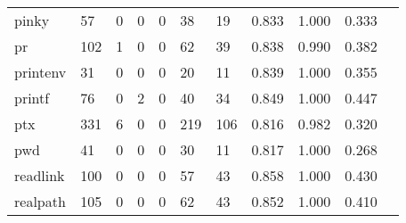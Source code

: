 \begin{longtable}{lp{1.10cm}p{1.10cm}p{1.10cm}p{1.10cm}p{1.10cm}p{1.10cm}p{1.10cm}p{1.10cm}p{1.10cm}p{1.10cm}}
pinky     &                     57 &                                  0 &                                 0 &                                0 &                                38 &                              19 &                          0.833 &                                 1.000 &                               0.333 \\
pr        &                    102 &                                  1 &                                 0 &                                0 &                                62 &                              39 &                          0.838 &                                 0.990 &                               0.382 \\
printenv  &                     31 &                                  0 &                                 0 &                                0 &                                20 &                              11 &                          0.839 &                                 1.000 &                               0.355 \\
printf    &                     76 &                                  0 &                                 2 &                                0 &                                40 &                              34 &                          0.849 &                                 1.000 &                               0.447 \\
ptx       &                    331 &                                  6 &                                 0 &                                0 &                               219 &                             106 &                          0.816 &                                 0.982 &                               0.320 \\
pwd       &                     41 &                                  0 &                                 0 &                                0 &                                30 &                              11 &                          0.817 &                                 1.000 &                               0.268 \\
readlink  &                    100 &                                  0 &                                 0 &                                0 &                                57 &                              43 &                          0.858 &                                 1.000 &                               0.430 \\
realpath  &                    105 &                                  0 &                                 0 &                                0 &                                62 &                              43 &                          0.852 &                                 1.000 &                               0.410 \\

\end{longtable}
